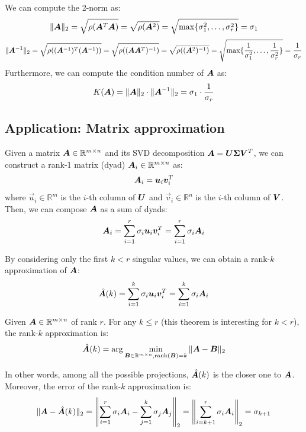 We can compute the 2-norm as:
\[ \Vert {\bm{A}} \Vert_2 = \sqrt{\rho({\bm{A}}^T{\bm{A}})} = \sqrt{\rho({\bm{A}}^2)} = \sqrt{\max\{\sigma_1^2, \dots, \sigma_r^2\}} = \sigma_1 \]
\[ 
    \Vert {\bm{A}}^{-1} \Vert_2 = \sqrt{\rho(({\bm{A}}^{-1})^T({\bm{A}}^{-1}))} = 
    \sqrt{\rho(({\bm{A}}{\bm{A}}^T)^{-1})} = \sqrt{\rho(({\bm{A}}^2)^{-1})} = \sqrt{\max\{\frac{1}{\sigma_1^2}, \dots, \frac{1}{\sigma_r^2}\}} = \frac{1}{\sigma_r}
\]
Furthermore, we can compute the condition number of ${\bm{A}}$ as:
\[ K({\bm{A}}) = \Vert {\bm{A}} \Vert_2 \cdot \Vert {\bm{A}}^{-1} \Vert_2 = \sigma_1 \cdot \frac{1}{\sigma_r} \]



\subsection{Application: Matrix approximation}
Given a matrix ${\bm{A}} \in \mathbb{R}^{m \times n}$ and its SVD decomposition ${\bm{A}} = {\bm{U}}{\bm{\Sigma}}{\bm{V}}^T$,
we can construct a rank-1 matrix (dyad) ${\bm{A}}_i \in \mathbb{R}^{m \times n}$ as: 
\[ {\bm{A}}_i = {\bm{u}}_i {\bm{v}}_i^T \]
where $\vec{u}_i \in \mathbb{R}^m$ is the $i$-th column of ${\bm{U}}$ and
$\vec{v}_i \in \mathbb{R}^n$ is the $i$-th column of ${\bm{V}}$.
Then, we can compose ${\bm{A}}$ as a sum of dyads:
\[ {\bm{A}}_i = \sum_{i=1}^{r} \sigma_i {\bm{u}}_i {\bm{v}}_i^T = \sum_{i=1}^{r} \sigma_i {\bm{A}}_i \]

By considering only the first $k < r$ singular values, we can obtain a rank-$k$ approximation of ${\bm{A}}$:
\[ \hat{{\bm{A}}}(k) = \sum_{i=1}^{k} \sigma_i {\bm{u}}_i {\bm{v}}_i^T = \sum_{i=1}^{k} \sigma_i {\bm{A}}_i \]

\begin{theorem}
    Given ${\bm{A}} \in \mathbb{R}^{m \times n}$ of rank $r$.
    For any $k \leq r$ (this theorem is interesting for $k < r$), the rank-$k$ approximation is:
    \[ 
        \hat{{\bm{A}}}(k) = \arg \min_{{\bm{B}} \in \mathbb{R}^{m \times n}, \text{rank}({\bm{B}}) = k} \Vert {\bm{A}} - {\bm{B}} \Vert_2 
    \]
\end{theorem}
In other words, among all the possible projections, $\hat{{\bm{A}}}(k)$ is the closer one to ${\bm{A}}$.
Moreover, the error of the rank-$k$ approximation is:
\[
    \Vert {\bm{A}} - \hat{{\bm{A}}}(k) \Vert_2 = 
        \left\Vert \sum_{i=1}^{r} \sigma_i {\bm{A}}_i - \sum_{j=1}^{k} \sigma_j {\bm{A}}_j \right\Vert_2 =
        \left\Vert \sum_{i=k+1}^{r} \sigma_i {\bm{A}}_i \right\Vert_2 = 
        \sigma_{k+1}
\]

